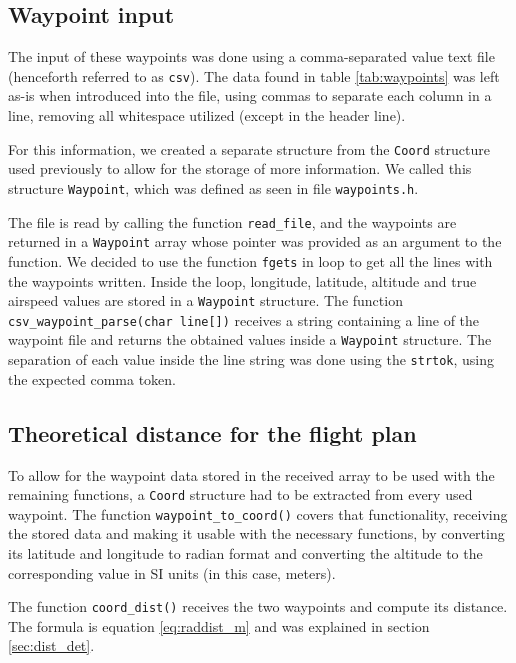 \documentclass{article}
\begin{document}
\subsection{Waypoint input}

The input of these waypoints was done using a comma-separated value text file (henceforth referred to as \texttt{csv}). The data found in table \ref{tab:waypoints} was left as-is when introduced into the file, using commas to separate each column in a line, removing all whitespace utilized (except in the header line).

For this information, we created a separate structure from the \texttt{Coord} structure used previously to allow for the storage of more information. We called this structure \texttt{Waypoint}, which was defined as seen in file \texttt{waypoints.h}.

The file is read by calling the function \texttt{read_file}, and the waypoints are returned in a \texttt{Waypoint} array whose pointer was provided as an argument to the function. We decided to use the function \texttt{fgets} in loop to get all the lines with the waypoints written. Inside the loop, longitude, latitude, altitude and true airspeed values are stored in a \texttt{Waypoint} structure. The function \texttt{csv_waypoint_parse(char line[])} receives a string containing a line of the waypoint file and returns the obtained values inside a \texttt{Waypoint} structure. The separation of each value inside the line string was done using the \texttt{strtok}, using the expected comma token.

\subsection{Theoretical distance for the flight plan}

To allow for the waypoint data stored in the received array to be used with the remaining functions, a \texttt{Coord} structure had to be extracted from every used waypoint. The function \texttt{waypoint_to_coord()} covers that functionality, receiving the stored data and making it usable with the necessary functions, by converting its latitude and longitude to radian format and converting the altitude to the corresponding value in SI units (in this case, meters).

The function \texttt{coord_dist()} receives the two waypoints and compute its distance. The formula is equation \ref{eq:raddist_m} and was explained in section \ref{sec:dist_det}.
\end{document}
